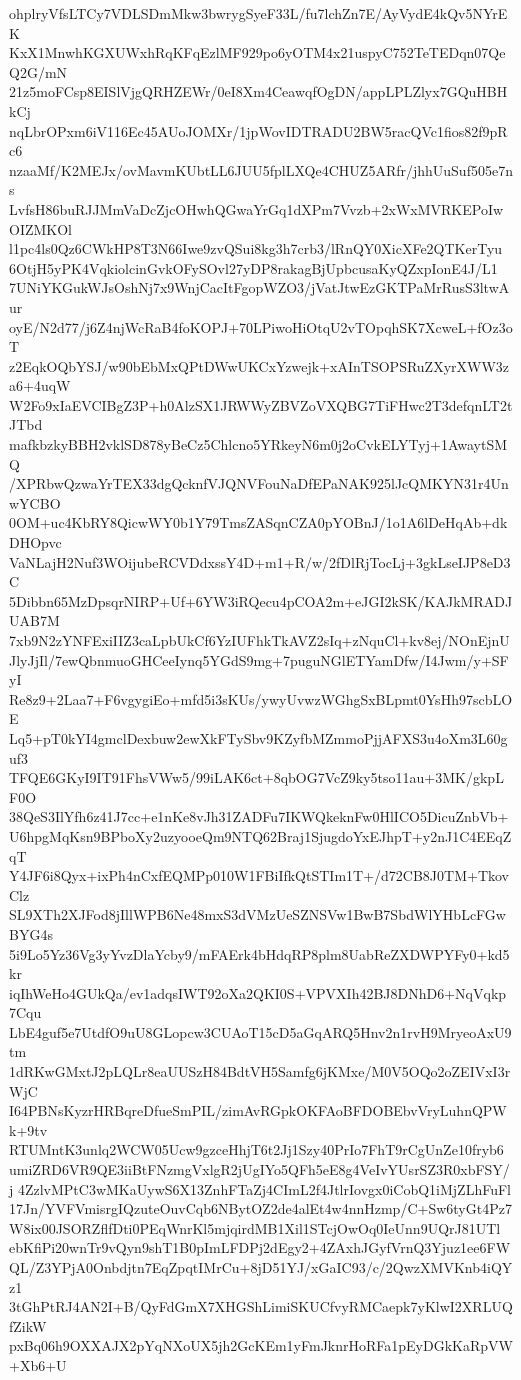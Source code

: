 ohplryVfsLTCy7VDLSDmMkw3bwrygSyeF33L/fu7lchZn7E/AyVydE4kQv5NYrEK
KxX1MnwhKGXUWxhRqKFqEzlMF929po6yOTM4x21uspyC752TeTEDqn07QeQ2G/mN
21z5moFCsp8EISlVjgQRHZEWr/0eI8Xm4CeawqfOgDN/appLPLZlyx7GQuHBHkCj
nqLbrOPxm6iV116Ec45AUoJOMXr/1jpWovIDTRADU2BW5racQVc1fios82f9pRc6
nzaaMf/K2MEJx/ovMavmKUbtLL6JUU5fplLXQe4CHUZ5ARfr/jhhUuSuf505e7ns
LvfsH86buRJJMmVaDcZjcOHwhQGwaYrGq1dXPm7Vvzb+2xWxMVRKEPoIwOIZMKOl
l1pc4ls0Qz6CWkHP8T3N66Iwe9zvQSui8kg3h7crb3/lRnQY0XicXFe2QTKerTyu
6OtjH5yPK4VqkiolcinGvkOFySOvl27yDP8rakagBjUpbcusaKyQZxpIonE4J/L1
7UNiYKGukWJsOshNj7x9WnjCacItFgopWZO3/jVatJtwEzGKTPaMrRusS3ltwAur
oyE/N2d77/j6Z4njWcRaB4foKOPJ+70LPiwoHiOtqU2vTOpqhSK7XcweL+fOz3oT
z2EqkOQbYSJ/w90bEbMxQPtDWwUKCxYzwejk+xAInTSOPSRuZXyrXWW3za6+4uqW
W2Fo9xIaEVCIBgZ3P+h0AlzSX1JRWWyZBVZoVXQBG7TiFHwc2T3defqnLT2tJTbd
mafkbzkyBBH2vklSD878yBeCz5Chlcno5YRkeyN6m0j2oCvkELYTyj+1AwaytSMQ
/XPRbwQzwaYrTEX33dgQcknfVJQNVFouNaDfEPaNAK925lJcQMKYN31r4UnwYCBO
0OM+uc4KbRY8QicwWY0b1Y79TmsZASqnCZA0pYOBnJ/1o1A6lDeHqAb+dkDHOpvc
VaNLajH2Nuf3WOijubeRCVDdxssY4D+m1+R/w/2fDlRjTocLj+3gkLseIJP8eD3C
5Dibbn65MzDpsqrNIRP+Uf+6YW3iRQecu4pCOA2m+eJGI2kSK/KAJkMRADJUAB7M
7xb9N2zYNFExiIIZ3caLpbUkCf6YzIUFhkTkAVZ2sIq+zNquCl+kv8ej/NOnEjnU
JlyJjIl/7ewQbnmuoGHCeeIynq5YGdS9mg+7puguNGlETYamDfw/I4Jwm/y+SFyI
Re8z9+2Laa7+F6vgygiEo+mfd5i3sKUs/ywyUvwzWGhgSxBLpmt0YsHh97scbLOE
Lq5+pT0kYI4gmclDexbuw2ewXkFTySbv9KZyfbMZmmoPjjAFXS3u4oXm3L60guf3
TFQE6GKyI9IT91FhsVWw5/99iLAK6ct+8qbOG7VcZ9ky5tso11au+3MK/gkpLF0O
38QeS3IlYfh6z41J7cc+e1nKe8vJh31ZADFu7IKWQkeknFw0HlICO5DicuZnbVb+
U6hpgMqKsn9BPboXy2uzyooeQm9NTQ62Braj1SjugdoYxEJhpT+y2nJ1C4EEqZqT
Y4JF6i8Qyx+ixPh4nCxfEQMPp010W1FBiIfkQtSTIm1T+/d72CB8J0TM+TkovClz
SL9XTh2XJFod8jIllWPB6Ne48mxS3dVMzUeSZNSVw1BwB7SbdWlYHbLcFGwBYG4s
5i9Lo5Yz36Vg3yYvzDlaYcby9/mFAErk4bHdqRP8plm8UabReZXDWPYFy0+kd5kr
iqIhWeHo4GUkQa/ev1adqsIWT92oXa2QKI0S+VPVXIh42BJ8DNhD6+NqVqkp7Cqu
LbE4guf5e7UtdfO9uU8GLopcw3CUAoT15cD5aGqARQ5Hnv2n1rvH9MryeoAxU9tm
1dRKwGMxtJ2pLQLr8eaUUSzH84BdtVH5Samfg6jKMxe/M0V5OQo2oZEIVxI3rWjC
I64PBNsKyzrHRBqreDfueSmPIL/zimAvRGpkOKFAoBFDOBEbvVryLuhnQPWk+9tv
RTUMntK3unlq2WCW05Ucw9gzceHhjT6t2Jj1Szy40PrIo7FhT9rCgUnZe10fryb6
umiZRD6VR9QE3iiBtFNzmgVxlgR2jUgIYo5QFh5eE8g4VeIvYUsrSZ3R0xbFSY/j
4ZzlvMPtC3wMKaUywS6X13ZnhFTaZj4CImL2f4JtlrIovgx0iCobQ1iMjZLhFuFl
17Jn/YVFVmisrgIQzuteOuvCqb6NBytOZ2de4alEt4w4nnHzmp/C+Sw6tyGt4Pz7
W8ix00JSORZflfDti0PEqWnrKl5mjqirdMB1Xil1STcjOwOq0IeUnn9UQrJ81UTl
ebKfiPi20wnTr9vQyn9shT1B0pImLFDPj2dEgy2+4ZAxhJGyfVrnQ3Yjuz1ee6FW
QL/Z3YPjA0Onbdjtn7EqZpqtIMrCu+8jD51YJ/xGaIC93/c/2QwzXMVKnb4iQYz1
3tGhPtRJ4AN2I+B/QyFdGmX7XHGShLimiSKUCfvyRMCaepk7yKlwI2XRLUQfZikW
pxBq06h9OXXAJX2pYqNXoUX5jh2GcKEm1yFmJknrHoRFa1pEyDGkKaRpVW+Xb6+U
